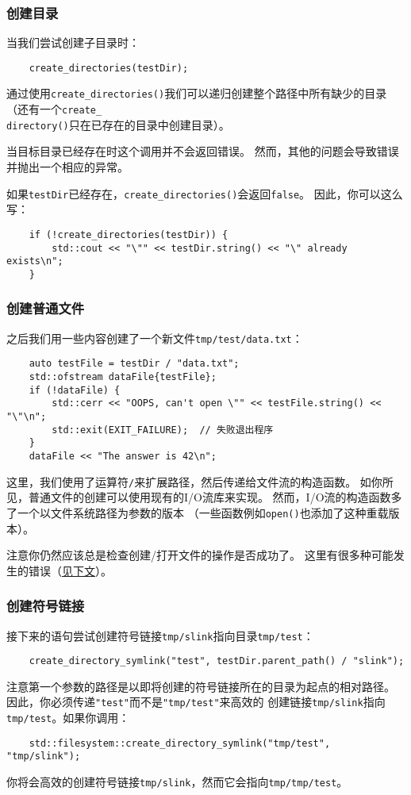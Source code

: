 \subsubsection{创建目录}
当我们尝试创建子目录时：
\begin{lstlisting}
    create_directories(testDir);
\end{lstlisting}
通过使用\texttt{create\_directories()}我们可以递归创建整个路径中所有缺少的目录
（还有一个\texttt{create\_\\
directory()}只在已存在的目录中创建目录）。

当目标目录已经存在时这个调用并不会返回错误。
然而，其他的问题会导致错误并抛出一个相应的异常。

如果\texttt{testDir}已经存在，\texttt{create\_directories()}会返回\texttt{false}。
因此，你可以这么写：
\begin{lstlisting}
    if (!create_directories(testDir)) {
        std::cout << "\"" << testDir.string() << "\" already exists\n";
    }
\end{lstlisting}

\subsubsection{创建普通文件}
之后我们用一些内容创建了一个新文件\texttt{tmp/test/data.txt}：
\begin{lstlisting}
    auto testFile = testDir / "data.txt";
    std::ofstream dataFile{testFile};
    if (!dataFile) {
        std::cerr << "OOPS, can't open \"" << testFile.string() << "\"\n";
        std::exit(EXIT_FAILURE);  // 失败退出程序
    }
    dataFile << "The answer is 42\n";
\end{lstlisting}
这里，我们使用了运算符\texttt{/}来扩展路径，然后传递给文件流的构造函数。
如你所见，普通文件的创建可以使用现有的I/O流库来实现。
然而，I/O流的构造函数多了一个以文件系统路径为参数的版本
（一些函数例如\texttt{open()}也添加了这种重载版本）。

注意你仍然应该总是检查创建/打开文件的操作是否成功了。
这里有很多种可能发生的错误（\hyperref[ch20.1.3.6]{见下文}）。

\subsubsection{创建符号链接}
接下来的语句尝试创建符号链接\texttt{tmp/slink}指向目录\texttt{tmp/test}：
\begin{lstlisting}
    create_directory_symlink("test", testDir.parent_path() / "slink");
\end{lstlisting}
注意第一个参数的路径是以即将创建的符号链接所在的目录为起点的相对路径。
因此，你必须传递\texttt{"test"}而不是\texttt{"tmp/test"}来高效的
创建链接\texttt{tmp/slink}指向\texttt{tmp/test}。如果你调用：
\begin{lstlisting}
    std::filesystem::create_directory_symlink("tmp/test", "tmp/slink");
\end{lstlisting}
你将会高效的创建符号链接\texttt{tmp/slink}，然而它会指向\texttt{tmp/tmp/test}。

